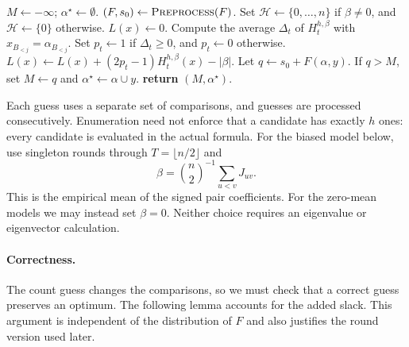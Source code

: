 \documentclass[11pt,a4paper]{article}
\theoremstyle{definition}
\theoremstyle{remark}
\begin{document}
\begin{algorithm}[H]
\caption{\textnormal{\textsc{CountComparisons}}$(F,\beta,B_1,\ldots,B_\ell)$}
\label{alg:counts}
\begin{algorithmic}[1]
\STATE $M\gets-\infty$; $\alpha^\star\gets\emptyset$.
\STATE $(F,s_0)\gets\textnormal{\textsc{Preprocess}}(F)$.
\STATE Set $\mathcal H\gets\{0,\ldots,n\}$ if $\beta\ne0$, and $\mathcal H\gets\{0\}$ otherwise.
    \STATE $L(x)\gets0$.
      \STATE Compute the average $\Delta_t$ of $H_t^{h,\beta}$ with $x_{B_{<j}}=\alpha_{B_{<j}}$.
      \STATE Set $p_t\gets1$ if $\Delta_t\ge0$, and $p_t\gets0$ otherwise.
        \STATE $L(x)\gets L(x)+(2p_t-1)H_t^{h,\beta}(x)-|\beta|$.
      \ENDIF
    \ENDFOR
      \STATE Let $q\gets s_0+F(\alpha,y)$.
      \STATE If $q>M$, set $M\gets q$ and $\alpha^\star\gets\alpha\cup y$.
    \ENDFOR
  \ENDFOR
\ENDFOR
\STATE \textbf{return} $(M,\alpha^\star)$.
\end{algorithmic}
\end{algorithm}

Each guess uses a separate set of comparisons, and guesses are processed
consecutively. Enumeration need not enforce that a candidate has exactly
$h$ ones: every candidate is evaluated in the actual formula.
For the biased model below, use singleton rounds through
$T=\lfloor n/2\rfloor$ and
\[
 \beta=\binom n2^{-1}\sum_{u<v}J_{uv}.
\]
This is the empirical mean of the signed pair coefficients.
For the zero-mean models we may instead set $\beta=0$.
Neither choice requires an eigenvalue or eigenvector calculation.

\paragraph{Correctness.}
The count guess changes the comparisons, so we must check that a correct
guess preserves an optimum. The following lemma accounts for the added
slack. This argument is independent of the distribution of $F$ and also
justifies the round version used later.
\end{document}
